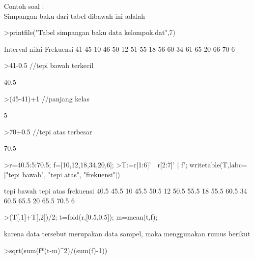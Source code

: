 \documentclass[a4paper,10pt]{article}
\begin{document}
\begin{eulernotebook}
\begin{eulercomment}
\begin{eulercomment}
\begin{eulercomment}
\begin{eulercomment}
\begin{eulercomment}
\begin{eulercomment}
\begin{eulercomment}
\begin{eulercomment}
\begin{eulercomment}
\begin{eulercomment}
\begin{eulercomment}
\begin{eulercomment}
\begin{eulercomment}
Contoh soal :\\
Simpangan baku dari tabel dibawah ini adalah
\end{eulercomment}
\begin{eulerprompt}
>printfile("Tabel simpangan baku data kelompok.dat",7)
\end{eulerprompt}
\begin{euleroutput}
        Interval nilai     Frekuensi
            41-45              10
            46-50              12
            51-55              18
            56-60              34
            61-65              20
            66-70              6
\end{euleroutput}
\begin{eulerprompt}
>41-0.5 //tepi bawah terkecil
\end{eulerprompt}
\begin{euleroutput}
  40.5
\end{euleroutput}
\begin{eulerprompt}
>(45-41)+1 //panjang kelas
\end{eulerprompt}
\begin{euleroutput}
  5
\end{euleroutput}
\begin{eulerprompt}
>70+0.5 //tepi atas terbesar
\end{eulerprompt}
\begin{euleroutput}
  70.5
\end{euleroutput}
\begin{eulerprompt}
>r=40.5:5:70.5; f=[10,12,18,34,20,6];
>T:=r[1:6]' | r[2:7]' | f'; writetable(T,labc=["tepi bawah", "tepi atas", "frekuensi"])
\end{eulerprompt}
\begin{euleroutput}
   tepi bawah tepi atas frekuensi
         40.5      45.5        10
         45.5      50.5        12
         50.5      55.5        18
         55.5      60.5        34
         60.5      65.5        20
         65.5      70.5         6
\end{euleroutput}
\begin{eulerprompt}
>(T[,1]+T[,2])/2; t=fold(r,[0.5,0.5]); m=mean(t,f);
\end{eulerprompt}
\begin{eulercomment}
karena data tersebut merupakan data sampel, maka menggunakan rumus
berikut
\end{eulercomment}
\begin{eulerprompt}
>sqrt(sum(f*(t-m)^2)/(sum(f)-1))
\end{eulerprompt}

\end{eulercomment}
\end{eulercomment}
\end{eulercomment}
\end{eulercomment}
\end{eulercomment}
\end{eulercomment}
\end{eulercomment}
\end{eulercomment}
\end{eulercomment}
\end{eulercomment}
\end{eulercomment}
\end{eulercomment}
\end{eulernotebook}
\end{document}
